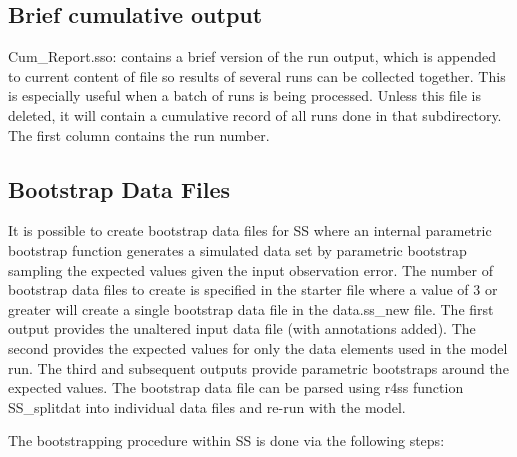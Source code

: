 \subsection{Brief cumulative output}
Cum\_Report.sso: contains a brief version of the run output, which is appended to current content of file so results of several runs can be collected together. This is especially useful when a batch of runs is being processed. Unless this file is deleted, it will contain a cumulative record of all runs done in that subdirectory. The first column contains the run number.  

\hypertarget{bootstrap}{}
\subsection{Bootstrap Data Files}
It is possible to create bootstrap data files for SS where an internal parametric bootstrap function generates a simulated data set by parametric bootstrap sampling the expected values given the input observation error. The number of bootstrap data files to create is specified in the starter file where a value of 3 or greater will create a single bootstrap data file in the data.ss\_new file. The first output provides the unaltered input data file (with annotations added).  The second provides the expected values for only the data elements used in the model run.  The third and subsequent outputs provide parametric bootstraps around the expected values. The bootstrap data file can be parsed using r4ss function SS\_splitdat into individual data files and re-run with the model.

The bootstrapping procedure within SS is done via the following steps:

